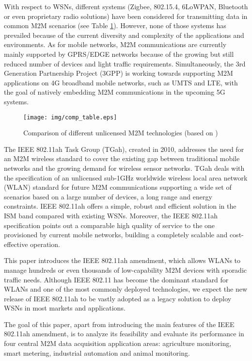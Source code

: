 \documentclass[]{article}
\begin{document}
With respect to WSNs, different systems (Zigbee, 802.15.4, 6LoWPAN, Bluetooth or even proprietary radio solutions) have been considered for transmitting data in common M2M scenarios (see Table \ref{fig:comp_table}). However, none of those systems has prevailed because of the current diversity and complexity of the applications and environments. As for mobile networks, M2M communications are currently mainly supported by GPRS/EDGE networks because of the growing but still reduced number of devices and light traffic requirements. Simultaneously, the 3rd Generation Partnership Project (3GPP) is working towards supporting M2M applications on 4G broadband mobile networks, such as UMTS and LTE, with the goal of natively embedding M2M communications in the upcoming 5G systems.
\vspace{2cm}
\renewcommand{\figurename}{Table}\begin{figure}[h!]
\centering
\texttt{[image: img/comp\_table.eps]}
\caption{Comparison of different unlicensed M2M technologies (based on \cite{badihy})}
\label{fig:comp_table}
\end{figure}
\renewcommand{\figurename}{Figure}

The IEEE 802.11ah Task Group (TGah), created in 2010, addresses the need for an M2M wireless standard to cover the existing gap between traditional mobile networks and the growing demand for wireless sensor networks. TGah deals with the specification of an unlicensed sub-1GHz worldwide wireless local area network (WLAN) standard for future M2M communications supporting a wide set of scenarios based on a large number of devices, a long range and energy constraints. IEEE 802.11ah offers a simple, robust and efficient solution in the ISM band compared with existing WSNs. Moreover, the IEEE 802.11ah specification points out a comparable high quality of service to the one provisioned by current mobile networks, building a completely scalable and cost-effective operation. 

This paper introduces the IEEE 802.11ah \cite{aust2012ieee,aust2012sub} amendment, which allows WLANs to manage hundreds or even thousands of low-capability M2M devices with sporadic traffic needs. Although IEEE 802.11 has become the dominant standard for WLANs and one of the most commonly deployed technologies, we expect the new release of IEEE 802.11ah to be vastly adopted as a legacy solution to deploy WSNs in most markets and applications.

The goal of this paper, apart from introducing the main features of the IEEE 802.11ah amendment, is to analyze its feasibility and evaluate its performance in four central M2M data acquisition application areas: agriculture monitoring, smart metering, industrial automation and animal monitoring.
\end{document}
